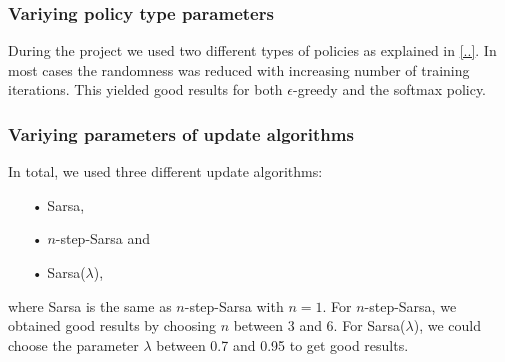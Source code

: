 \subsubsection*{Variying policy type parameters}
During the project we used two different types of policies as explained in \ref{..}. In most cases the randomness was reduced with increasing number of training iterations. This yielded good results for both $\epsilon$-greedy and the softmax policy.

\subsubsection*{Variying parameters of update algorithms}
In total, we used three different update algorithms:
\begin{itemize}
\item[•] Sarsa,
\item[•] $n$-step-Sarsa and
\item[•] Sarsa($\lambda$),
\end{itemize}
where Sarsa is the same as $n$-step-Sarsa with $n=1$. For $n$-step-Sarsa, we obtained good results by choosing $n$ between 3 and 6. For Sarsa($\lambda$), we could choose the parameter $\lambda$ between 0.7 and 0.95 to get good results.












